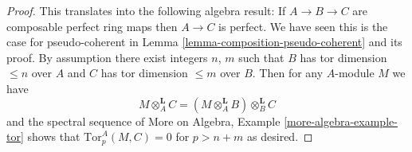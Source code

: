 \documentclass[10pt,a4paper]{amsart}
\theoremstyle{plain}
\theoremstyle{definition}
\theoremstyle{remark}
\numberwithin{equation}{subsection}
\begin{document}
\begin{proof}
This translates into the following algebra result:
If $A \to B \to C$ are composable perfect ring maps
then $A \to C$ is perfect. We have seen this is the case for
pseudo-coherent in
Lemma \ref{lemma-composition-pseudo-coherent}
and its proof. By assumption there exist integers $n$, $m$ such
that $B$ has tor dimension $\leq n$ over $A$ and $C$ has tor dimension
$\leq m$ over $B$. Then for any $A$-module $M$ we have
$$
M \otimes_A^{\mathbf{L}} C =
(M \otimes_A^{\mathbf{L}} B) \otimes_B^{\mathbf{L}} C
$$
and the spectral sequence of
More on Algebra, Example \ref{more-algebra-example-tor}
shows that $\text{Tor}^A_p(M, C) = 0$ for $p > n + m$ as desired.
\end{proof}
\end{document}
